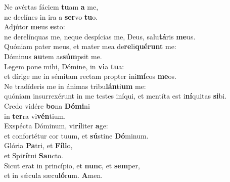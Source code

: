 \evenverse Ne avértas fáciem \textbf{tu}am \textbf{a} me,~\*\\
\evenverse ne declínes in ira a \textbf{ser}vo \textbf{tu}o.\\
\oddverse Adjútor \textbf{me}us \textbf{e}sto:~\*\\
\oddverse ne derelínquas me, neque despícias me, Deus, salu\textbf{tá}ris \textbf{me}us.\\
\evenverse Quóniam pater meus, et mater mea de\textbf{re}li\textbf{qué}\textbf{runt} me:~\*\\
\evenverse Dóminus \textbf{au}tem as\textbf{súm}psit me.\\
\oddverse Legem pone mihi, Dómine, in \textbf{vi}a \textbf{tu}a:~\*\\
\oddverse et dírige me in sémitam rectam propter ini\textbf{mí}cos \textbf{me}os.\\
\evenverse Ne tradíderis me in ánimas tribu\textbf{lán}ti\textbf{um} me:~\*\\
\evenverse quóniam insurrexérunt in me testes iníqui, et mentíta est i\textbf{ní}quitas \textbf{si}bi.\\
\oddverse Credo vidére \textbf{bo}na \textbf{Dó}\textbf{mi}ni~\*\\
\oddverse in \textbf{ter}ra vi\textbf{vén}tium.\\
\evenverse Exspécta Dóminum, vi\textbf{rí}liter \textbf{a}ge:~\*\\
\evenverse et confortétur cor tuum, et \textbf{sú}stine \textbf{Dó}minum.\\
\oddverse Glória \textbf{Pa}tri, et \textbf{Fí}\textbf{li}o,~\*\\
\oddverse et Spi\textbf{rí}tui \textbf{San}cto.\\
\evenverse Sicut erat in princípio, et \textbf{nunc}, et \textbf{sem}per,~\*\\
\evenverse et in sǽcula sæcu\textbf{ló}rum. \textbf{A}men.\\

